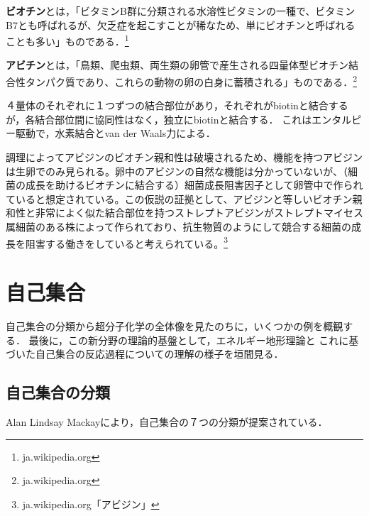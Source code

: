 \documentclass[uplatex, dvipdfmx]{jsreport}
\begin{document}
\begin{definition}[Biotin]
    \textbf{ビオチン}とは，「ビタミンB群に分類される水溶性ビタミンの一種で、ビタミンB7とも呼ばれるが、欠乏症を起こすことが稀なため、単にビオチンと呼ばれることも多い」ものである．\footnote{ja.wikipedia.org}
\end{definition}
\begin{definition}[Avidin]
    \textbf{アビチン}とは，「鳥類、爬虫類、両生類の卵管で産生される四量体型ビオチン結合性タンパク質であり、これらの動物の卵の白身に蓄積される」ものである．\footnote{ja.wikipedia.org}

    ４量体のそれぞれに１つずつの結合部位があり，それぞれがbiotinと結合するが，各結合部位間に協同性はなく，独立にbiotinと結合する．
    これはエンタルピー駆動で，水素結合とvan der Waals力による．
\end{definition}
\begin{remark}
    調理によってアビジンのビオチン親和性は破壊されるため、機能を持つアビジンは生卵でのみ見られる。卵中のアビジンの自然な機能は分かっていないが、（細菌の成長を助けるビオチンに結合する）細菌成長阻害因子として卵管中で作られていると想定されている。この仮説の証拠として、アビジンと等しいビオチン親和性と非常によく似た結合部位を持つストレプトアビジンがストレプトマイセス属細菌のある株によって作られており、抗生物質のようにして競合する細菌の成長を阻害する働きをしていると考えられている。\footnote{ja.wikipedia.org「アビジン」}
\end{remark}

\chapter{自己集合}
自己集合の分類から超分子化学の全体像を見たのちに，いくつかの例を概観する．
最後に，この新分野の理論的基盤として，エネルギー地形理論と
これに基づいた自己集合の反応過程についての理解の様子を垣間見る．

\section{自己集合の分類}
Alan Lindsay Mackayにより，自己集合の７つの分類が提案されている．
\end{document}
